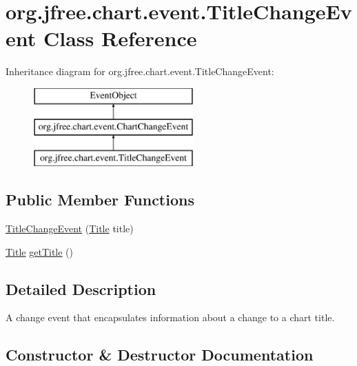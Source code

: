 \hypertarget{classorg_1_1jfree_1_1chart_1_1event_1_1_title_change_event}{}\section{org.\+jfree.\+chart.\+event.\+Title\+Change\+Event Class Reference}
\label{classorg_1_1jfree_1_1chart_1_1event_1_1_title_change_event}
Inheritance diagram for org.\+jfree.\+chart.\+event.\+Title\+Change\+Event\+:\begin{figure}[H]
\begin{center}
\leavevmode
\includegraphics[height=3.000000cm]{classorg_1_1jfree_1_1chart_1_1event_1_1_title_change_event}
\end{center}
\end{figure}
\subsection*{Public Member Functions}
\begin{DoxyCompactItemize}
\item 
\mbox{\hyperlink{classorg_1_1jfree_1_1chart_1_1event_1_1_title_change_event_ac7179cb98e3092ff5ebac25c6a673b74}{Title\+Change\+Event}} (\mbox{\hyperlink{classorg_1_1jfree_1_1chart_1_1title_1_1_title}{Title}} title)
\item 
\mbox{\hyperlink{classorg_1_1jfree_1_1chart_1_1title_1_1_title}{Title}} \mbox{\hyperlink{classorg_1_1jfree_1_1chart_1_1event_1_1_title_change_event_ac5fe52d497b9d0a39e7164f0f6f08f5d}{get\+Title}} ()
\end{DoxyCompactItemize}


\subsection{Detailed Description}
A change event that encapsulates information about a change to a chart title. 

\subsection{Constructor \& Destructor Documentation}
\mbox{\label{classorg_1_1jfree_1_1chart_1_1event_1_1_title_change_event_ac7179cb98e3092ff5ebac25c6a673b74}} 
